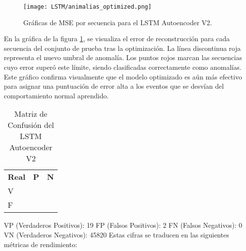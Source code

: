       \begin{figure}[H]
            \centering
            \texttt{[image: LSTM/animalias\_optimized.png]}
            \caption{Gráficas de MSE por secuencia para el LSTM Autoencoder V2.}
            \label{fig:mse_lstm_optimized}
      \end{figure}

      En la gráfica de la figura \ref{fig:mse_lstm_optimized}, se visualiza el error de reconstrucción para cada secuencia del conjunto de prueba tras la optimización. La línea discontinua roja representa el nuevo umbral de anomalía. Los puntos rojos marcan las secuencias cuyo error superó este límite, siendo clasificadas correctamente como anomalías. Este gráfico confirma visualmente que el modelo optimizado es aún más efectivo para asignar una puntuación de error alta a los eventos que se desvían del comportamiento normal aprendido.

      \begin{table}[H]
            \doublespacing
            \small
            \centering
            \begin{tabular}{ >{\centering\arraybackslash}p{3cm} >{\centering\arraybackslash}p{3cm} >{\centering\arraybackslash}p{3cm} }
                  \hline
                                & \multicolumn{2}{c}{\textbf{Esperado}}              \\
                  \hline
                  \textbf{Real} & \textbf{P}                            & \textbf{N} \\
                  \hline
                  V             & 19                                    & 0  \\
                  F             & 2                                     & 45820         \\
                  \hline
            \end{tabular}
            \caption{Matriz de Confusión del LSTM Autoencoder V2}
            \label{tab:confusion_matrix_lstm_optimized}
      \end{table}

      VP (Verdaderos Positivos): 19
      FP (Falsos Positivos): 2
      FN (Falsos Negativos): 0
      VN (Verdaderos Negativos): 45820
      Estas cifras se traducen en las siguientes métricas de rendimiento:

